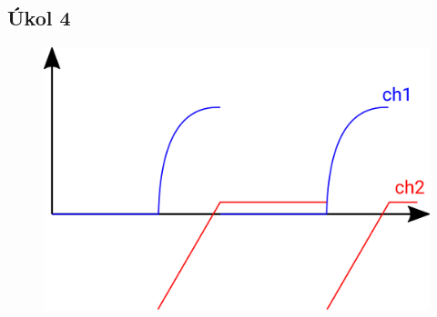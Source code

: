 \documentclass[5pt]{article}
\begin{document}
\subsection{Úkol 4}
\begin{figure}[htp]
    \centering
    \includegraphics[scale=0.35]{graph.png}
    \caption{}
    \label{}
\end{figure}
\end{document}
